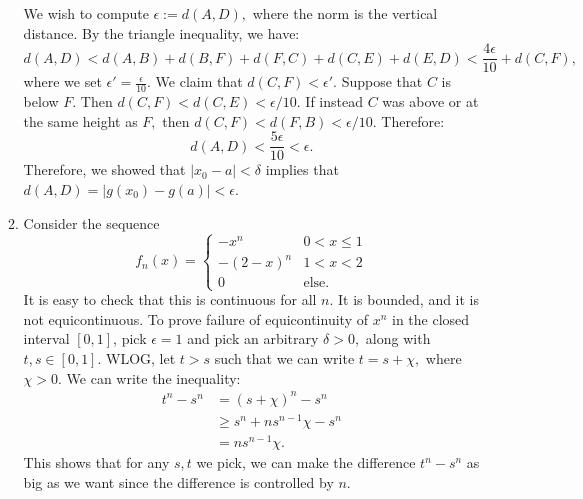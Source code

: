 \documentclass{article}
\numberwithin{equation}{section}
\begin{document}
\begin{enumerate}
\begin{enumerate}[label=(\alph*)]
        We wish to compute $\epsilon:=d(A,D),$ where the norm is the vertical distance. By the triangle inequality, we have:
        \begin{equation}
            d(A,D) < d(A,B)+d(B,F)+d(F,C)+d(C,E)+d(E,D) < \frac{4\epsilon}{10}+d(C,F),
        \end{equation}
        where we set $\epsilon' = \frac{\epsilon}{10}.$ We claim that $d(C,F) < \epsilon'.$ Suppose that $C$ is below $F.$ Then $d(C,F) < d(C,E) < \epsilon/10.$ If instead $C$ was above or at the same height as $F,$ then $d(C,F) < d(F,B) < \epsilon/10.$ Therefore:
        \begin{equation}
            d(A,D) < \frac{5\epsilon}{10} < \epsilon.
        \end{equation}
        Therefore, we showed that $|x_0-a|<\delta$ implies that $d(A,D)=|g(x_0)-g(a)|<\epsilon.$
        \item Consider the sequence
        \begin{equation}
            f_n(x) = \begin{cases}
                -x^n & 0<x \le 1 \\ 
                -(2-x)^n & 1<x<2 \\ 
                0 & \text{else}.
            \end{cases}
        \end{equation}
        It is easy to check that this is continuous for all $n.$ It is bounded, and it is not equicontinuous. To prove failure of equicontinuity of $x^n$ in the closed interval $[0,1]$, pick $\epsilon = 1$ and pick an arbitrary $\delta > 0,$ along with $t,s\in[0,1].$ WLOG, let $t>s$ such that we can write $t=s+\chi,$ where $\chi > 0.$ We can write the inequality:
        \begin{align}
            t^n-s^n &= (s+\chi)^n - s^n \\ 
            &\ge s^n + ns^{n-1}\chi - s^n \\ 
            &= ns^{n-1}\chi .
        \end{align} 
        This shows that for any $s,t$ we pick, we can make the difference $t^n-s^n$ as big as we want since the difference is controlled by $n.$
        

\end{enumerate}
\end{enumerate}
\end{document}
